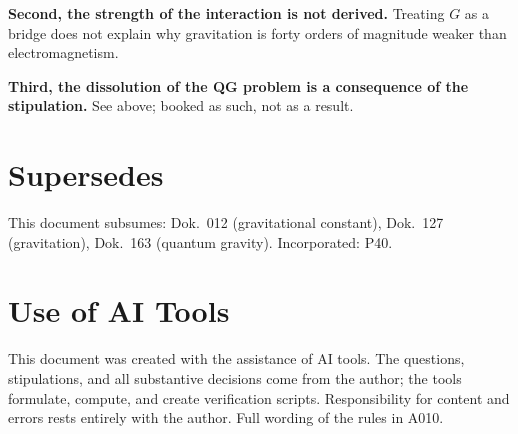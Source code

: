 \textbf{Second, the strength of the interaction is not derived.} Treating $G$ as a
bridge does not explain why gravitation is forty orders of magnitude weaker than
electromagnetism.

\textbf{Third, the dissolution of the QG problem is a consequence of the
stipulation.} See above; booked as such, not as a result.

\section{Supersedes}

This document subsumes: Dok.~012 (gravitational constant), Dok.~127 (gravitation),
Dok.~163 (quantum gravity). Incorporated: P40.

\section{Use of AI Tools}

This document was created with the assistance of AI tools. The questions,
stipulations, and all substantive decisions come from the author; the tools
formulate, compute, and create verification scripts.
Responsibility for content and errors rests entirely with the author.
Full wording of the rules in A010.
